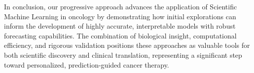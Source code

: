 \documentclass{juliacon}
\begin{document}
In conclusion, our progressive approach advances the application of Scientific Machine Learning in oncology by demonstrating how initial explorations can inform the development of highly accurate, interpretable models with robust forecasting capabilities. The combination of biological insight, computational efficiency, and rigorous validation positions these approaches as valuable tools for both scientific discovery and clinical translation, representing a significant step toward personalized, prediction-guided cancer therapy.



\end{document}
